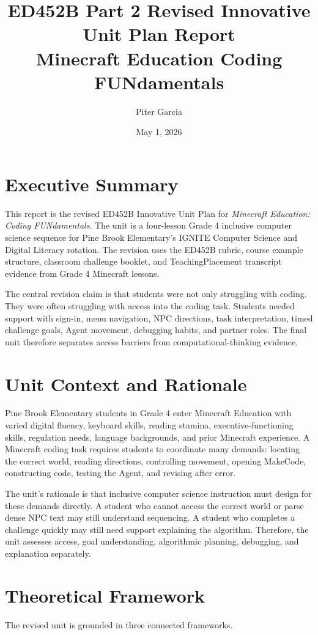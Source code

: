 \documentclass[12pt]{article}
\title{ED452B Part 2 Revised Innovative Unit Plan Report\\Minecraft Education Coding FUNdamentals}
\author{Piter Garcia}
\date{May 1, 2026}
\begin{document}
\maketitle
\tableofcontents
\newpage

\section{Executive Summary}
This report is the revised ED452B Innovative Unit Plan for \emph{Minecraft Education: Coding FUNdamentals}. The unit is a four-lesson Grade 4 inclusive computer science sequence for Pine Brook Elementary's IGNITE Computer Science and Digital Literacy rotation. The revision uses the ED452B rubric, course example structure, classroom challenge booklet, and TeachingPlacement transcript evidence from Grade 4 Minecraft lessons.

The central revision claim is that students were not only struggling with coding. They were often struggling with access into the coding task. Students needed support with sign-in, menu navigation, NPC directions, task interpretation, timed challenge goals, Agent movement, debugging habits, and partner roles. The final unit therefore separates access barriers from computational-thinking evidence.

\section{Unit Context and Rationale}
Pine Brook Elementary students in Grade 4 enter Minecraft Education with varied digital fluency, keyboard skills, reading stamina, executive-functioning skills, regulation needs, language backgrounds, and prior Minecraft experience. A Minecraft coding task requires students to coordinate many demands: locating the correct world, reading directions, controlling movement, opening MakeCode, constructing code, testing the Agent, and revising after error.

The unit's rationale is that inclusive computer science instruction must design for these demands directly. A student who cannot access the correct world or parse dense NPC text may still understand sequencing. A student who completes a challenge quickly may still need support explaining the algorithm. Therefore, the unit assesses access, goal understanding, algorithmic planning, debugging, and explanation separately.

\section{Theoretical Framework}
The revised unit is grounded in three connected frameworks.
\end{document}
